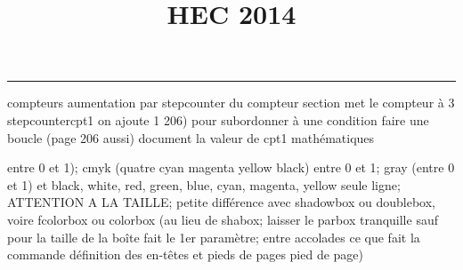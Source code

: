 \documentclass[11pt]{article}%
\title{\bf \vspace{-1cm} HEC 2014} %
\author{} %
\date{} %
\renewcommand{\headrulewidth}{0pt}%
\renewcommand{\footrulewidth}{0.4pt}%
\begin{document}
\maketitle %
\vspace{-1.2cm}\hrule %
\thispagestyle{fancy}

\vspace*{.4cm}


compteurs%
aumentation par stepcounter du compteur section%
met le compteur à 3%
stepcounter{cpt1} on ajoute 1%
206) pour subordonner à une condition %
faire une boucle (page 206 aussi) %
document la valeur de cpt1 
mathématiques\newcommand{\ch}{\operatorname{ch}} 
\newcommand{\sh}{\operatorname{sh}}
\renewcommand{\tanh}{\operatorname{th}}
\renewcommand{\sinh}{\operatorname{sh}}
\renewcommand{\cosh}{\operatorname{ch}}
\newcommand{\argsh}{\operatorname{argsh}}
\newcommand{\argch}{\operatorname{argch}}
\newcommand{\argth}{\operatorname{argth}}
\newcommand{\Id}{\operatorname{Id}}
\newcommand{\id}{\operatorname{id}}
\renewcommand{\im}{\operatorname{Im}}
\renewcommand{\leq}{\leq}
\renewcommand{\geq}{\geq }

\newcommand{\dlim}{\lim}
\newcommand{\dsum}{\sum\limits}
\newcommand{\dprod}{\prod}
\newcommand{\lb}{\llbracket}
\newcommand{\rb}{\rrbracket}


entre 0 et 1); cmyk (quatre cyan magenta yellow black) entre 0 et 1;
gray (entre 0 et 1) et black, white, red, green, blue, cyan, magenta,
yellow%
seule ligne; ATTENTION A LA TAILLE; petite différence avec shadowbox ou
doublebox, voire fcolorbox ou colorbox (au lieu de shabox; laisser le
parbox tranquille sauf pour la taille de la boîte
\newcommand{\Tbox}[1]{\begin{center} \shabox{\parbox{0.8
\linewidth}{#1}} \end{center}} %
fait le 1er paramètre; entre accolades ce que fait la commande
définition des en-têtes et pieds de pages\pagestyle{fancy}
\chead{}
\rfoot[ \ \thepage]{\thepage}
\cfoot{}
\lfoot{}
\thispagestyle{fancy} %
pied de page)\renewcommand{\footrulewidth}{0.4pt}
\renewcommand{\headrulewidth}{0.4pt}
\end{document}
